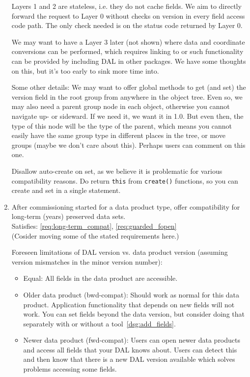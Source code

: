\documentclass[a4paper,11pt]{article}
\begin{document}
\begin{enumerate}[label=\it D.\arabic{*}]
Layers 1 and 2 are stateless, i.e. they do not cache fields. We aim to directly forward the request to Layer 0 without checks on version in every field access code path.
The only check needed is on the status code returned by Layer 0.

We may want to have a Layer 3 later (not shown) where data and coordinate conversions can be performed, which requires linking to or such functionality can be provided by including DAL in other packages.
We have some thoughts on this, but it's too early to sink more time into.


Some other details:
We may want to offer global methods to get (and set) the version field in the root group from anywhere in the object tree.
Even so, we may also need a parent group node in each object, otherwise you cannot navigate up- or sideward.
If we need it, we want it in 1.0.
But even then, the type of this node will be the type of the parent, which means you cannot easily have the same group type in different places in the tree, or move groups (maybe we don't care about this).
Perhaps users can comment on this one. %

Disallow auto-create on set, as we believe it is problematic for various compatibility reasons.
Do return \texttt{this} from \texttt{create()} functions, so you can create and set in a single statement.

\item \label{dsg:long-term_compat} After commissioning started for a data product type, offer compatibility for long-term (years) preserved data sets.\\
Satisfies: \ref{req:long-term_compat}, \ref{req:guarded_fopen}\\
(Cosider moving some of the stated requirements here.)

Foreseen limitations of DAL version vs. data product version (assuming version mismatches in the minor version number):
\begin{itemize}
\itemsep0em
\item Equal: All fields in the data product are accessible.
\item Older data product (bwd-compat):
Should work as normal for this data product.
Application functionality that depends on new fields will not work.
You can set fields beyond the data version, but consider doing that separately with or without a tool~\ref{dsg:add_fields}.
\item Newer data product (fwd-compat):
Users can open newer data products and access all fields that your DAL knows about.
Users can detect this and then know that there is a new DAL version available which solves problems accessing some fields.
\end{itemize}


\end{enumerate}
\end{document}
